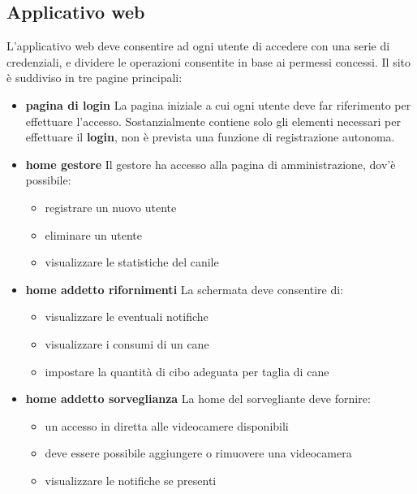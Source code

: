     \subsection{Applicativo web}
        L'applicativo web deve consentire ad ogni utente di accedere con una serie di credenziali, e dividere le operazioni consentite in base ai permessi concessi.
        Il sito è suddiviso in tre pagine principali:
        \begin{itemize}
            \item \textbf{pagina di login}
                La pagina iniziale a cui ogni utente deve far riferimento per effettuare l'accesso.
                Sostanzialmente contiene solo gli elementi necessari per effettuare il \textbf{login}, non è prevista una funzione di registrazione autonoma.
            \item \textbf{home gestore}
                Il gestore ha accesso alla pagina di amministrazione, dov'è possibile:
                \begin{itemize}
                    \item registrare un nuovo utente
                    \item eliminare un utente
                    \item visualizzare le statistiche del canile
                \end{itemize}
            \item \textbf{home addetto rifornimenti}
                La schermata deve consentire di:
               \begin{itemize}
                    \item visualizzare le eventuali notifiche
                    \item visualizzare i consumi di un cane
                    \item impostare la quantità di cibo adeguata per taglia di cane
                \end{itemize}
            \item \textbf{home addetto sorveglianza}
                La home del sorvegliante deve fornire:
               \begin{itemize}
                    \item un accesso in diretta alle videocamere disponibili
                    \item deve essere possibile aggiungere o rimuovere una videocamera
                    \item visualizzare le notifiche se presenti
                \end{itemize}

\end{itemize}
